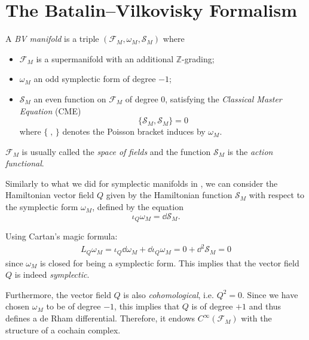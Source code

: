 \section{The Batalin–Vilkovisky Formalism}
\label{sec:BV_formalism}

\begin{definition}
\label{def:BV_manifold}
    A \emph{BV manifold} is a triple $(\mathcal{F}_M, \omega_M, \mathcal{S}_M)$ where
    \begin{itemize}
        \item $\mathcal{F}_M$ is a supermanifold with an additional $\mathbb{Z}$-grading;
        \item $\omega_M$ an odd symplectic form of degree $-1$;
        \item $\mathcal{S}_M$ an even function on $\mathcal{F}_M$ of degree $0$, satisfying the \emph{Classical Master Equation} (CME)
        \begin{equation}
            \{\mathcal{S}_M, \mathcal{S}_M\} = 0
        \end{equation}
        where $\{\;,\,\}$ denotes the Poisson bracket induces by $\omega_M$.
    \end{itemize}
\end{definition}

$\mathcal{F}_M$ is usually called the \emph{space of fields} and the function $\mathcal{S}_M$ is the \emph{action functional}.

Similarly to what we did for symplectic manifolds in , we can consider the Hamiltonian vector field $Q$ given by the Hamiltonian function $\mathcal{S}_M$ with respect to the symplectic form $\omega_M$, defined by the equation
\begin{equation*}
    \iota_Q \omega_M = \dd \mathcal{S}_M.
\end{equation*}

Using Cartan's magic formula:
\begin{align*}
    L_Q \omega_M = \iota_Q \dd \omega_M + \dd \iota_Q \omega_M =
    0 + \dd^2 \mathcal{S}_M = 0
\end{align*}
since $\omega_M$ is closed for being a symplectic form.
This implies that the vector field $Q$ is indeed \emph{symplectic}.

Furthermore, the vector field $Q$ is also \emph{cohomological}, i.e. $Q^2 = 0$.
Since we have chosen $\omega_M$ to be of degree $-1$, this implies that $Q$ is of degree $+1$ and thus defines a de Rham differential.
Therefore, it endows $C^\infty(\mathcal{F}_M)$ with the structure of a cochain complex.


